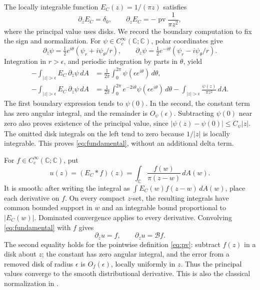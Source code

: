 \documentclass[11pt]{article}
\newcommand{\C}{\mathbb C}
\newcommand{\B}{\mathcal B}
\newcommand{\dz}{\partial_z}
\newcommand{\db}{\partial_{\bar z}}
\newcommand{\pv}{\operatorname{pv}}
\begin{document}
The locally integrable function \(E_C(z)=1/(\pi z)\) satisfies
\begin{equation}\label{eq:fundamental}
 \db E_C=\delta_0,\qquad
 \dz E_C=-\pv\frac1{\pi z^2},
\end{equation}
where the principal value uses disks. We record the boundary computation
to fix the sign and normalization. For
\(\psi\in C_c^\infty(\C;\C)\), polar coordinates give
\[
 \db\psi=\tfrac12e^{i\theta}(\psi_r+i\psi_\theta/r),
 \qquad
 \dz\psi=\tfrac12e^{-i\theta}(\psi_r-i\psi_\theta/r).
\]
Integration in \(r>\epsilon\), and periodic integration by parts in
\(\theta\), yield
\begin{align*}
 -\int_{|z|>\epsilon} E_C\,\db\psi\,dA
   &=\frac1{2\pi}\int_0^{2\pi}\psi(\epsilon e^{i\theta})\,d\theta,\\
 -\int_{|z|>\epsilon} E_C\,\dz\psi\,dA
   &=\frac1{2\pi}\int_0^{2\pi}e^{-2i\theta}
                         \psi(\epsilon e^{i\theta})\,d\theta
       -\int_{|z|>\epsilon}\frac{\psi(z)}{\pi z^2}\,dA.
\end{align*}
The first boundary expression tends to \(\psi(0)\).
In the second, the constant term has zero angular integral, and the
remainder is \(O_\psi(\epsilon)\). Subtracting \(\psi(0)\) near zero
also proves existence of the principal value, since
\(|\psi(z)-\psi(0)|\le C_\psi|z|\). The omitted disk integrals on the
left tend to zero because \(1/|z|\) is locally integrable.
This proves \eqref{eq:fundamental}, without an additional delta term.

For \(f\in C_c^\infty(\C;\C)\), put
\[
 u(z)=(E_C*f)(z)=\int_\C\frac{f(w)}{\pi(z-w)}\,dA(w).
\]
It is smooth: after writing the integral as
\(\int E_C(w)f(z-w)\,dA(w)\), place each derivative on \(f\).
On every compact \(z\)-set, the resulting integrals have common bounded
support in \(w\) and an integrable bound proportional to \(|E_C(w)|\).
Dominated convergence applies to every derivative.
Convolving \eqref{eq:fundamental} with \(f\) gives
\begin{equation}\label{eq:potentialidentity}
 \db u=f,\qquad \dz u=\B f .
\end{equation}
The second equality holds for the pointwise definition
\eqref{eq:pv}: subtract \(f(z)\) in a disk about \(z\); the constant
has zero angular integral, and the error from a removed disk of radius
\(\epsilon\) is \(O_f(\epsilon)\), locally uniformly in \(z\).
Thus the principal values converge to the smooth distributional derivative.
This is also the classical normalization in
\cite[equations~(1.3), (2.1), (2.2)]{bms}.
\end{document}

